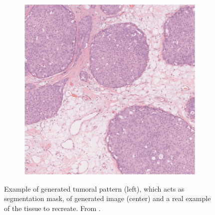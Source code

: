 \begin{figure}[ht]
\begin{subfigure}[t]{0.3\textwidth}
             \caption{}
             \label{fig:morpho_model}
        \end{subfigure}
        \quad
        \begin{subfigure}[t]{0.3\textwidth}
             \centering
             \includegraphics[width = \textwidth]{images/morpho_real}
             \caption{}
             \label{fig:morpho_real}
        \end{subfigure}
        \caption{Example of generated tumoral pattern (left), which acts as segmentation mask, of generated image (center) and a real example of the tissue to recreate. From \cite{10.1117/12.2254452}.}
        \label{fig:morpho_tripl}
    \end{figure}


